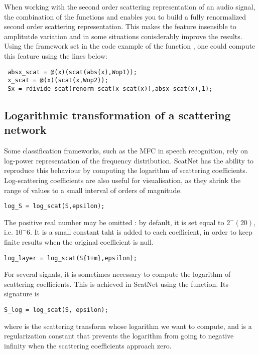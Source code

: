 \documentclass{article}
\begin{document}
When working with the second order scattering representation of an audio signal, the combination
of the functions  and   enables you to build a fully renormalized second order
scattering representation. This makes the feature insensible to amplitutde variation and in some situations conisderably improve the results. 
Using the framework set in the code example of the function ,  one could compute this feature using the lines below:


\begin{lstlisting}
 absx_scat = @(x)(scat(abs(x),Wop1));
 x_scat = @(x)(scat(x,Wop2));
 Sx = rdivide_scat(renorm_scat(x_scat(x)),absx_scat(x),1);

\end{lstlisting}


\subsection{Logarithmic transformation of a scattering network}
Some classification frameworks, such as the MFC in speech recognition, rely on log-power representation of the frequency distribution. ScatNet has the 
ability to reproduce this behaviour by computing the logarithm of scattering coefficients. Log-scattering coefficients are also useful for visualisation, as they shrink the range of values to a small interval of orders of magnitude.

\begin{lstlisting}
log_S = log_scat(S,epsilon);
\end{lstlisting}
The positive real number  may be omitted : by default, it is set equal to $2^-(20)$, i.e. $10^-6$. It is a small constant taht is added to each coefficient, in order to keep finite results when the original coefficient is null.

\begin{lstlisting}
log_layer = log_scat(S{1+m},epsilon);
\end{lstlisting}
For several signals, it is sometimes necessary to compute the logarithm of scattering coefficients. This is achieved in ScatNet using the  function. Its signature is

\begin{lstlisting}
S_log = log_scat(S, epsilon);
\end{lstlisting}
where  is the scattering transform whose logarithm we want to compute, and  is a regularization constant that prevents the logarithm from going to negative infinity when the scattering coefficients approach zero.
\end{document}
